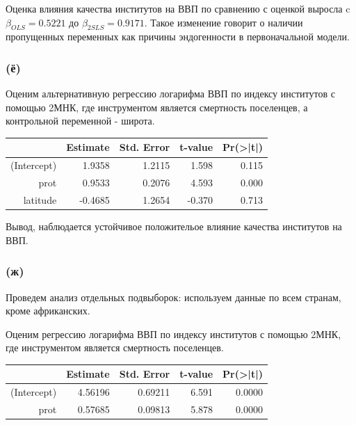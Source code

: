 \documentclass[a4paper,12pt]{article} %
\begin{document}
Оценка влияния качества институтов на ВВП по
сравнению с оценкой выросла c $ \beta_{OLS} = 0.5221 $ до  $ \beta_{2SLS} = 0.9171 $. Такое
изменение говорит о наличии пропущенных переменных как причины эндогенности в первоначальной модели.


\subsubsection*{(ё)}	

Оценим альтернативную регрессию логарифма ВВП по индексу институтов с помощью 2МНК, где инструментом является смертность  поселенцев, а контрольной переменной - широта.

\begin{table}[h!]
	\centering
	\begin{tabular}{rrrrr}
		\hline
		& Estimate & Std. Error & t-value & Pr(>|t|) \\ 
		\hline
		(Intercept) &   1.9358   &  1.2115  & 1.598  &  0.115  \\ 
		prot & 0.9533   &  0.2076 &  4.593 & 0.000 \\ 
		latitude &    -0.4685    & 1.2654 & -0.370  &  0.713
			\\ 
		\hline
	\end{tabular}
\end{table}	

Вывод, наблюдается устойчивое  положительое  влияние качества институтов на ВВП.


\subsubsection*{(ж)}

Проведем анализ отдельных подвыборок:   используем  данные по всем странам, кроме
африканских.

Оценим регрессию логарифма ВВП по индексу институтов с помощью 2МНК, где инструментом является смертность  поселенцев.

\begin{table}[h!]
	\centering
	\begin{tabular}{rrrrr}
		\hline
		& Estimate & Std. Error & t-value & Pr(>|t|) \\ 
		\hline
		(Intercept) & 4.56196  &  0.69211 &  6.591 & 0.0000  \\ 
		prot & 0.57685 &   0.09813  & 5.878 & 0.0000 
		\\ 
		\hline
	\end{tabular}
\end{table}	
\end{document}
